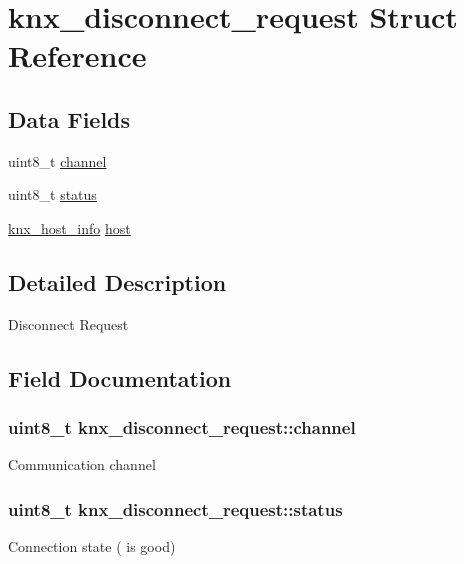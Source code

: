 \hypertarget{structknx__disconnect__request}{}\section{knx\+\_\+disconnect\+\_\+request Struct Reference}
\label{structknx__disconnect__request}
\subsection*{Data Fields}
\begin{DoxyCompactItemize}
\item 
uint8\+\_\+t \hyperlink{structknx__disconnect__request_a7d3e372bf3d8c93a5a85649858237f92}{channel}
\item 
uint8\+\_\+t \hyperlink{structknx__disconnect__request_a9243b4700cd8c549a5da8c396d1fc65b}{status}
\item 
\hyperlink{structknx__host__info}{knx\+\_\+host\+\_\+info} \hyperlink{structknx__disconnect__request_a3eba6f0a52bec029e5bea9ecab2fe2a3}{host}
\end{DoxyCompactItemize}


\subsection{Detailed Description}
Disconnect Request 

\subsection{Field Documentation}
\subsubsection[{\texorpdfstring{channel}{channel}}]{\setlength{\rightskip}{0pt plus 5cm}uint8\+\_\+t knx\+\_\+disconnect\+\_\+request\+::channel}\hypertarget{structknx__disconnect__request_a7d3e372bf3d8c93a5a85649858237f92}{}\label{structknx__disconnect__request_a7d3e372bf3d8c93a5a85649858237f92}
Communication channel 
\subsubsection[{\texorpdfstring{status}{status}}]{\setlength{\rightskip}{0pt plus 5cm}uint8\+\_\+t knx\+\_\+disconnect\+\_\+request\+::status}\hypertarget{structknx__disconnect__request_a9243b4700cd8c549a5da8c396d1fc65b}{}\label{structknx__disconnect__request_a9243b4700cd8c549a5da8c396d1fc65b}
Connection state ({} is good) 
